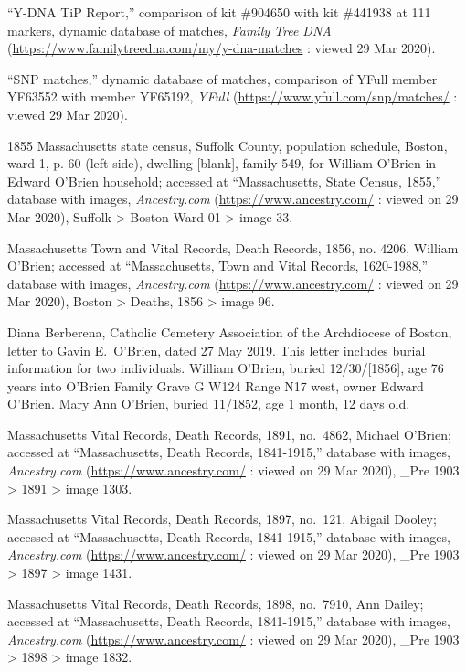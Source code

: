 \begin{thebibliography}{99}
	``Y-DNA TiP Report,'' comparison of kit \#904650 with kit \#441938 at 111 markers, dynamic database of matches, \textit{Family Tree DNA} (\url{https://www.familytreedna.com/my/y-dna-matches} : viewed 29 Mar 2020).
	
	``SNP matches,'' dynamic database of matches, comparison of YFull member YF63552 with member YF65192, \textit{YFull} (\url{https://www.yfull.com/snp/matches/} : viewed 29 Mar 2020).
	
	1855 Massachusetts state census, Suffolk County, population schedule, Boston, ward 1, p. 60 (left side), dwelling [blank], family 549, for William O'Brien in Edward O'Brien household; accessed at ``Massachusetts, State Census, 1855,'' database with images, \textit{Ancestry.com} (\url{https://www.ancestry.com/} : viewed on 29 Mar 2020), Suffolk > Boston Ward 01 > image 33.
		
	Massachusetts Town and Vital Records, Death Records, 1856, no. 4206, William O'Brien; accessed at ``Massachusetts, Town and Vital Records, 1620-1988,'' database with images, \textit{Ancestry.com} (\url{https://www.ancestry.com/} : viewed on 29 Mar 2020), Boston > Deaths, 1856 > image 96.
		
	Diana Berberena, Catholic Cemetery Association of the Archdiocese of Boston, letter to Gavin E.\ O'Brien, dated 27 May 2019. This letter includes burial information for two individuals. William O'Brien, buried 12/30/[1856], age 76 years into O'Brien Family Grave G W124 Range N17 west, owner Edward O'Brien. Mary Ann O'Brien, buried 11/1852, age 1 month, 12 days old.
	
	Massachusetts Vital Records, Death Records, 1891, no.\ 4862, Michael O'Brien; accessed at ``Massachusetts, Death Records, 1841-1915,'' database with images, \textit{Ancestry.com} (\url{https://www.ancestry.com/} : viewed on 29 Mar 2020), \_Pre 1903 > 1891 > image 1303.
	
	Massachusetts Vital Records, Death Records, 1897, no.\ 121, Abigail Dooley; accessed at ``Massachusetts, Death Records, 1841-1915,'' database with images, \textit{Ancestry.com} (\url{https://www.ancestry.com/} : viewed on 29 Mar 2020), \_Pre 1903 > 1897 > image 1431.
	
	Massachusetts Vital Records, Death Records, 1898, no.\ 7910, Ann Dailey; accessed at ``Massachusetts, Death Records, 1841-1915,'' database with images, \textit{Ancestry.com} (\url{https://www.ancestry.com/} : viewed on 29 Mar 2020), \_Pre 1903 > 1898 > image 1832.
	

\end{thebibliography}
